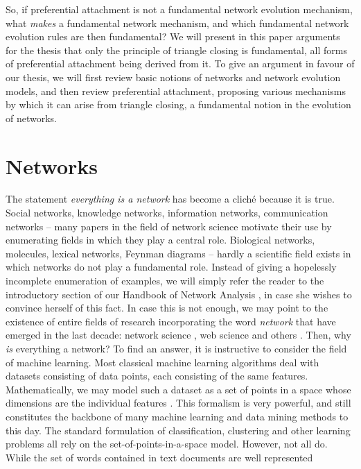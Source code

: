\documentclass{jimis}
\begin{document}
So, if preferential attachment is not a fundamental network evolution
mechanism, what \emph{makes} a fundamental network mechanism, and which
fundamental network evolution rules are then fundamental?  We will
present in this paper arguments for the thesis that
only the principle of triangle closing is fundamental, all forms of
preferential attachment being derived from it. 
To give an
argument in favour of our thesis, we will first review basic notions of
networks and network evolution models, and then review 
preferential attachment, proposing various mechanisms by which
it can arise from triangle closing, a fundamental notion in the
evolution of networks. 

\section{Networks}
The statement \emph{everything is a network} has become a cliché because
it is true.  Social networks, knowledge networks, information networks,
communication networks -- many papers in the field of network science
motivate their use by enumerating fields in which they play a central
role.  Biological networks, molecules, lexical networks, Feynman
diagrams -- hardly a scientific field exists in which networks do not play
a fundamental role.  Instead of giving a hopelessly incomplete
enumeration of examples, we will simply refer the reader to the
introductory section of our Handbook of Network Analysis
\citep{konect:handbook}, in case she wishes to convince herself of
this fact.  In case this is not enough, we may point to the existence of entire
fields of research incorporating the word \emph{network} that have emerged
in the last decade: network science \citep{network-science,newman2010networks}, web science
\citep{web-science} and others \citep{tiropanis2015}.
Then, why \emph{is} everything a network?
To find an answer, it is instructive to consider the field of machine
learning. 
Most classical machine learning algorithms deal with
datasets consisting of data points, each consisting of the same
features.  Mathematically, we may model such a dataset as a set of
points in a space whose dimensions are the individual features \citep{vector-space-model}.
This formalism is very powerful, and still constitutes the backbone of many
machine learning and data mining methods to this day.  The standard
formulation of classification, clustering and other learning problems
all rely on the set-of-points-in-a-space model. However, not all do.
While the set of words contained in text documents are well represented
\end{document}
